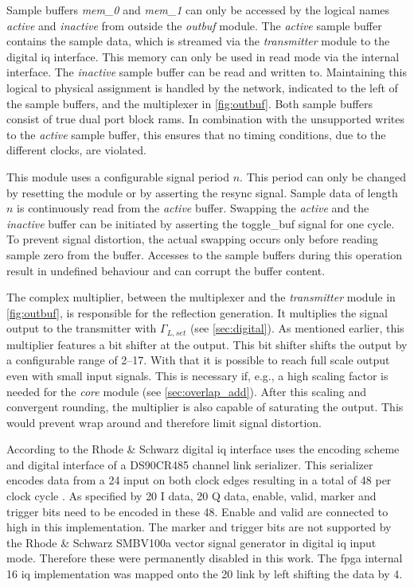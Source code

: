 \documentclass[12pt,a4paper,parskip=full,abstract=true,BCOR=12mm,twoside,open=right]{scrreprt}
\def\device#1{\textit{#1}}
\begin{document}
Sample buffers \device{mem\_0} and \device{mem\_1} can only be accessed by the
logical names \device{active} and \device{inactive} from outside the
\device{outbuf} module. The \device{active} sample buffer contains the sample data,
which is streamed via the \device{transmitter} module to the digital \gls{iq}
interface. This memory can only be used in read mode via the internal interface.
The \device{inactive} sample buffer can be read and written to. Maintaining this
logical to physical assignment is handled by the network, indicated to the left
of the sample buffers, and the multiplexer in \cref{fig:outbuf}. Both sample
buffers consist of true dual port block \glspl{ram}. In combination with the
unsupported writes to the \device{active} sample buffer, this ensures that
no timing conditions, due to the different clocks, are violated.

This module uses a configurable signal period $n$. This period can only be changed
by resetting the module or by asserting the resync signal. Sample data of length $n$ is
continuously read from the \device{active} buffer. Swapping the \device{active}
and the \device{inactive} buffer can be initiated by asserting the toggle\_buf
signal for one cycle. To prevent signal distortion, the actual swapping occurs
only before reading sample zero from the buffer. Accesses to the sample buffers
during this operation result in undefined behaviour and can corrupt the buffer
content.

The complex multiplier, between the multiplexer and the \device{transmitter}
module in \cref{fig:outbuf}, is responsible for the
reflection generation. It multiplies the signal output to the transmitter
with $\Gamma_{L,set}$ (see \cref{sec:digital}). As mentioned earlier, this
multiplier features a bit shifter at the output. This bit shifter shifts the
output by a configurable range of \SIrange{2}{17}{\bit}. With that
it is possible to reach full scale output even with small input
signals. This is necessary if, e.g., a high scaling factor is needed
for the \device{core} module (see \cref{sec:overlap_add}). After this scaling
and convergent rounding, the multiplier is also capable of saturating the
output. This would prevent wrap around and therefore limit signal distortion.

According to \cite{fsq_b17} the Rhode \& Schwarz digital \gls{iq} interface
uses the encoding scheme and digital interface of a DS90CR485 channel link
serializer. This serializer encodes data from a \SI{24}{\bit} input on both
clock edges resulting in a total of \SI{48}{\bit} per clock cycle \cite{ds90cr485}.
As specified by \cite{fsq_b17} \SI{20}{\bit} I data, \SI{20}{\bit} Q data, enable,
valid, marker and trigger bits need to be encoded in these \SI{48}{\bit}. Enable
and valid are connected to high in this implementation. The marker and trigger
bits are not supported by the Rhode \& Schwarz SMBV100a vector signal generator
in digital \gls{iq} input mode. Therefore these were permanently disabled in this
work. The \gls{fpga} internal \SI{16}{\bit} \gls{iq} implementation was mapped
onto the \SI{20}{\bit} link by left shifting the data by \SI{4}{\bit}.
\end{document}
